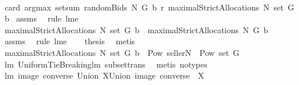 \begin{isabellebody}
\ {\isacharminus}\ \isanewline
{}\isamarkupfalse%
\ {\isachardoublequoteopen}{}{\isacharequal}card\ {\isacharparenleft}argmax\ {\isacharparenleft}setsum\ {\isacharparenleft}randomBids\ N\ G\ b\ r{\isacharparenright}{\isacharparenright}\ {\isacharparenleft}maximalStrictAllocations{\isacharprime}\ N\ {\isacharparenleft}set\ G{\isacharparenright}\ b{\isacharparenright}{\isacharparenright}{\isachardoublequoteclose}\isanewline
{}\isamarkupfalse%
\ assms\ \isamarkupfalse%
\ {\isacharparenleft}rule\ lm{}{}e{\isacharparenright}\isanewline
{}\isamarkupfalse%
\ \isamarkupfalse%
\ {\isachardoublequoteopen}maximalStrictAllocations{\isacharprime}\ N\ {\isacharparenleft}set\ G{\isacharparenright}\ b\ {\isacharequal}\ maximalStrictAllocations\ N\ G\ b{\isachardoublequoteclose}\ \isanewline
{}\isamarkupfalse%
\ assms{\isacharparenleft}{}{\isacharcomma}{}{\isacharparenright}\ \isamarkupfalse%
\ {\isacharparenleft}rule\ lm{}{}e{\isacharparenright}\ \isamarkupfalse%
\ \isamarkupfalse%
\ {\isacharquery}thesis\ \isamarkupfalse%
\ metis\isanewline
{}\isamarkupfalse%
%
\endisatagproof
{\isafoldproof}%
%
\isadelimproof
\isanewline
%
\endisadelimproof
\isanewline
{}\isamarkupfalse%
\ {\isachardoublequoteopen}maximalStrictAllocations{\isacharprime}\ N\ {\isacharparenleft}set\ G{\isacharparenright}\ b\ {\isasymsubseteq}\ Pow\ {\isacharparenleft}{\isacharparenleft}{\isacharbraceleft}seller{\isacharbraceright}{\isasymunion}N{\isacharparenright}\ {\isasymtimes}\ {\isacharparenleft}Pow\ {\isacharparenleft}set\ G{\isacharparenright}\ {\isacharminus}\ {\isacharbraceleft}{\isacharbraceleft}{\isacharbraceright}{\isacharbraceright}{\isacharparenright}{\isacharparenright}{\isachardoublequoteclose}\isanewline
%
\isadelimproof
%
\endisadelimproof
%
\isatagproof
{}\isamarkupfalse%
\ lm{}{}\ UniformTieBreaking{\isachardot}lm{}{}\ subset{\isacharunderscore}trans\ \isamarkupfalse%
\ {\isacharparenleft}metis\ {\isacharparenleft}no{\isacharunderscore}types{\isacharparenright}{\isacharparenright}%
\endisatagproof
{\isafoldproof}%
%
\isadelimproof
\isanewline
%
\endisadelimproof
\isanewline
{}\isamarkupfalse%
\ lm{}{}{\isacharcolon}\ {\isachardoublequoteopen}{\isacharparenleft}image\ converse{\isacharparenright}\ {\isacharparenleft}Union\ X{\isacharparenright}{\isacharequal}Union\ {\isacharparenleft}{\isacharparenleft}image\ converse{\isacharparenright}\ {\isacharbackquote}\ X{\isacharparenright}{\isachardoublequoteclose}%

\end{isabellebody}
